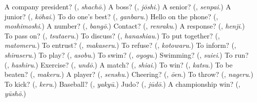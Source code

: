 \begin{tcolorbox}[breakable,colback=teal!4,colframe=teal!35!black,title={Before you move on}]
A company president? (\textbf{}, \emph{shachō}.) A boss? (\textbf{}, \emph{jōshi}.) A senior? (\textbf{}, \emph{senpai}.) A junior? (\textbf{}, \emph{kōhai}.) To do one's best? (\textbf{}, \emph{ganbaru}.) Hello on the phone? (\textbf{}, \emph{moshimoshi}.) A number? (\textbf{}, \emph{bangō}.) Contact? (\textbf{}, \emph{renraku}.) A response? (\textbf{}, \emph{henji}.) To pass on? (\textbf{}, \emph{tsutaeru}.) To discuss? (\textbf{}, \emph{hanashiau}.) To put together? (\textbf{}, \emph{matomeru}.) To entrust? (\textbf{}, \emph{makaseru}.) To refuse? (\textbf{}, \emph{kotowaru}.) To inform? (\textbf{}, \emph{shiraseru}.) To play? (\textbf{}, \emph{asobu}.) To swim? (\textbf{}, \emph{oyogu}.) Swimming? (\textbf{}, \emph{suiei}.) To run? (\textbf{}, \emph{hashiru}.) Exercise? (\textbf{}, \emph{undō}.) A match? (\textbf{}, \emph{shiai}.) To win? (\textbf{}, \emph{katsu}.) To be beaten? (\textbf{}, \emph{makeru}.) A player? (\textbf{}, \emph{senshu}.) Cheering? (\textbf{}, \emph{ōen}.) To throw? (\textbf{}, \emph{nageru}.) To kick? (\textbf{}, \emph{keru}.) Baseball? (\textbf{}, \emph{yakyū}.) Judo? (\textbf{}, \emph{jūdō}.) A championship win? (\textbf{}, \emph{yūshō}.)
\end{tcolorbox}
